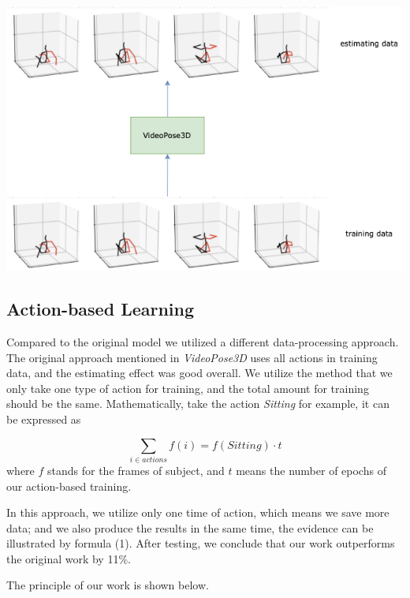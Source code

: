 \documentclass[10pt,twocolumn,letterpaper]{article}
\begin{document}
\includegraphics[scale=0.35]{model.png}

\subsection{Action-based Learning}

Compared to the original model we utilized a different data-processing approach. The original approach
mentioned in \textit{VideoPose3D} uses all actions in training data, and the estimating effect was good
overall. We utilize the method that we only take one type of action for training, and the total amount 
for training should be the same. Mathematically, take the action \textit{Sitting} for example, it can 
be expressed as

\begin{equation}
	\sum_{i\in actions}{f(i)} = f(Sitting)\cdot t
\end{equation}
where $f$ stands for the frames of subject, and $t$ means the number of epochs of our action-based 
training.

In this approach, we utilize only one time of action, which means we save more data; and we also produce
the results in the same time, the evidence can be illustrated by formula (1). After testing, we conclude 
that our work outperforms the original work by 11\%.

The principle of our work is shown below.
\end{document}
